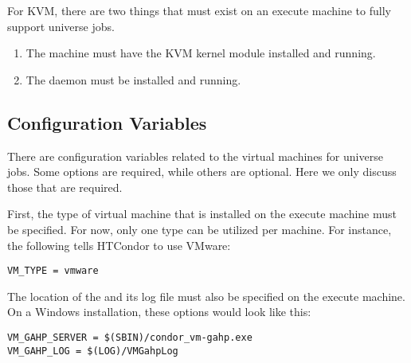 For KVM, there are two things that must exist on
an execute machine to fully support  universe jobs. 
\begin{enumerate}
\item
The machine must have the KVM kernel module installed and running.

\item
The  daemon must be installed and running.

\end{enumerate}

\subsection{Configuration Variables}

There are configuration variables related to the virtual machines
for  universe jobs.
Some options are required, while others are optional.
Here we only discuss those that are required.

First, the type of virtual machine that is installed on the
execute machine must be specified. 
For now, only one type can be utilized per machine.
For instance, the following tells HTCondor to use VMware:

\begin{verbatim}
VM_TYPE = vmware
\end{verbatim}

The location of the  and
its log file must also be specified on the execute machine.
On a Windows installation, these options would look like this:

\begin{verbatim}
VM_GAHP_SERVER = $(SBIN)/condor_vm-gahp.exe
VM_GAHP_LOG = $(LOG)/VMGahpLog
\end{verbatim}





